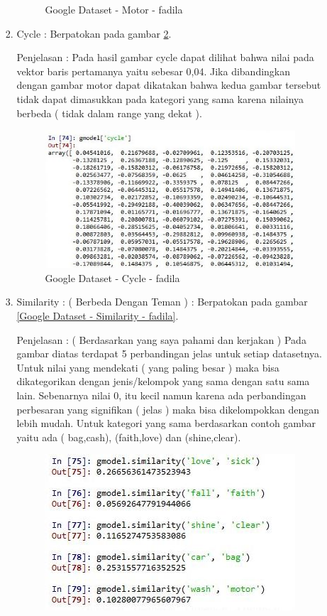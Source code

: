 \begin{enumerate}
\begin{enumerate}
\begin{enumerate}
\begin{figure}[!hbtp]
\caption{Google Dataset - Motor - fadila}
\label{Google Dataset - Motor - fadila}
\end{figure}
\par
\item Cycle :  Berpatokan pada gambar \ref{Google Dataset - Cycle - fadila}.
\par Penjelasan : Pada hasil gambar cycle dapat dilihat bahwa nilai pada vektor baris pertamanya yaitu sebesar 0,04. Jika dibandingkan dengan gambar motor dapat dikatakan bahwa kedua gambar tersebut tidak dapat dimasukkan pada kategori yang sama  karena nilainya berbeda ( tidak dalam range yang dekat ).
\par
\begin{figure}[!hbtp]
\centering
\includegraphics[scale=0.3]{figures/1-cycle-fadila.jpg}
\caption{Google Dataset - Cycle - fadila}
\label{Google Dataset - Cycle - fadila}
\end{figure}
\par
\item Similarity : ( Berbeda Dengan Teman ) :  Berpatokan pada gambar \ref{Google Dataset - Similarity - fadila}.
\par Penjelasan : ( Berdasarkan yang saya pahami dan kerjakan ) Pada gambar diatas terdapat 5 perbandingan jelas untuk setiap datasetnya. Untuk nilai yang mendekati ( yang paling besar ) maka bisa dikategorikan dengan jenis/kelompok yang sama dengan satu sama lain. Sebenarnya nilai 0, itu kecil namun karena ada perbandingan perbesaran yang signifikan ( jelas ) maka bisa dikelompokkan dengan lebih mudah. Untuk kategori yang sama berdasarkan contoh gambar yaitu ada ( bag,cash), (faith,love) dan (shine,clear). 
\par
\begin{figure}[!hbtp]
\centering
\includegraphics[scale=0.3]{figures/1-similarity-fadila.jpg}

\end{figure}
\end{enumerate}
\end{enumerate}
\end{enumerate}
